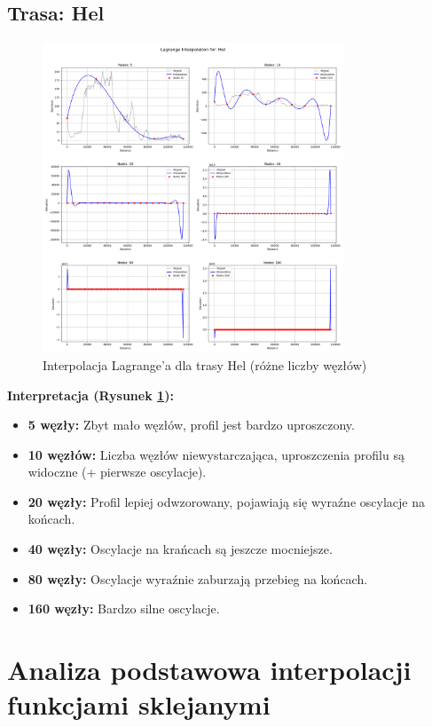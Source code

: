 \documentclass[11pt,a4paper]{article}
\begin{document}
\subsection{Trasa: Hel}
\begin{figure}[H]
    \centering
    \includegraphics[width=0.8\textwidth]{plots/Hel_Lagrange_basic.png}
    \caption{Interpolacja Lagrange'a dla trasy Hel (różne liczby węzłów)}
    \label{fig:hel_lagrange}
\end{figure}
\textbf{Interpretacja (Rysunek \ref{fig:hel_lagrange}):} 
\begin{itemize}
    \item \textbf{5 węzły:} Zbyt mało węzłów, profil jest bardzo uproszczony.
    \item \textbf{10 węzłów:} Liczba węzłów niewystarczająca, uproszczenia profilu są widoczne (+ pierwsze oscylacje).
    \item \textbf{20 węzły:} Profil lepiej odwzorowany, pojawiają się wyraźne oscylacje na końcach.
    \item \textbf{40 węzły:} Oscylacje na krańcach są jeszcze mocniejsze.
    \item \textbf{80 węzły:} Oscylacje wyraźnie zaburzają przebieg na końcach.
    \item \textbf{160 węzły:} Bardzo silne oscylacje.
\end{itemize}

\section{Analiza podstawowa interpolacji funkcjami sklejanymi}
\end{document}
